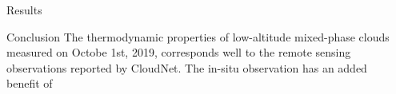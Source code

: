 \documentclass[final]{beamer}
\newlength{\sepwidth}
\newlength{\colwidth}
\newcommand{\separatorcolumn}{\begin{column}{\sepwidth}\end{column}}
\begin{document}
\begin{frame}[t]
\begin{columns}[t]
\begin{column}{\colwidth}
\begin{alertblock}{Results}
      \end{alertblock}

      \begin{block}{Conclusion}
        The thermodynamic properties of low-altitude mixed-phase clouds measured on Octobe 1st, 2019, corresponds well to the remote sensing observations reported by CloudNet. The in-situ observation has an added benefit of 
      \end{block}

    \end{column}

    \separatorcolumn
  \end{columns}

\end{frame}
\end{document}

